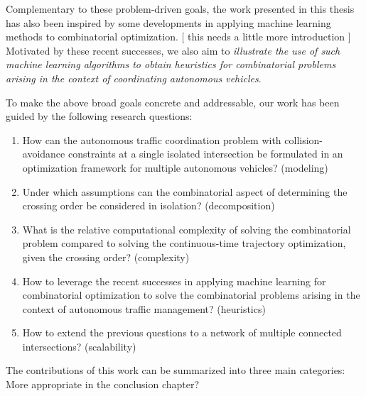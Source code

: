 \documentclass[a4paper]{report}
\theoremstyle{definition}
\theoremstyle{plain}
\newcommand\note[1]{{\color{Navy}#1}}
\begin{document}
Complementary to these problem-driven goals, the work presented in this thesis
has also been inspired by some developments in applying machine learning methods
to combinatorial optimization.
%
%
\note{[ this needs a little more introduction ]}
Motivated by these recent successes, we also aim to \emph{illustrate the use of
  such machine learning algorithms to obtain heuristics for combinatorial problems arising in the context of coordinating autonomous
  vehicles}.

To make the above broad goals concrete and addressable, our work has been guided
by the following research questions:

\begin{enumerate}[label=RQ\arabic*:, leftmargin=3em, rightmargin=4em]
  \item How can the autonomous traffic coordination problem with
        collision-avoidance constraints at a single isolated intersection be
        formulated in an optimization framework for multiple autonomous
        vehicles? (modeling)

  \item Under which assumptions can the combinatorial aspect of determining the
        crossing order be considered in isolation? (decomposition)

  \item What is the relative computational complexity of solving the
        combinatorial problem compared to solving the continuous-time trajectory
        optimization, given the crossing order? (complexity)

  \item How to leverage the recent successes in applying machine learning for
        combinatorial optimization to solve the combinatorial problems arising
        in the context of autonomous traffic management? (heuristics)

  \item How to extend the previous questions to a network of multiple connected
        intersections? (scalability)
\end{enumerate}



The contributions of this work can be summarized into three main categories:
\note{More appropriate in the conclusion chapter?}
\end{document}
